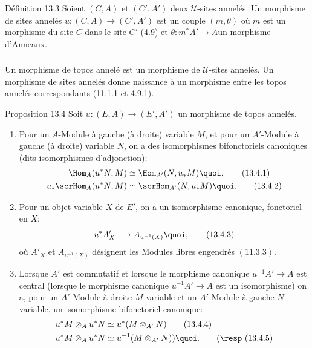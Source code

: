 \begin{enonce*}{Définition 13.3}
Soient $(C,A)$ et $(C',A')$ deux $𝒰$-sites annelés. Un
morphisme de sites annelés $u:(C,A)\rightarrow (C',A')$ est un
couple $(m,\theta)$ où $m$ est un morphisme du site $C$ dans le site
$C'$ (\hyperref[IV.subsec4.9]{4.9}) et $\theta:m^{\ast}A'\rightarrow
A$\pageoriginale un morphisme d'Anneaux.
\end{enonce*}

\setcounter{subsection}{3} \setcounter{subsubsection}{0}
\subsubsection{}
Un morphisme de topos annelé est un morphisme de $𝒰$-sites
annelés. Un morphisme de sites annelés donne naissance à un
morphisme entre les topos annelés correspondants
(\hyperref[IV.subsubsec11.1.1]{11.1.1} et \hyperref[IV.subsubsec4.9.1]{4.9.1}).

\begin{enonce*}{Proposition 13.4}
Soit $u:(E,A)\rightarrow (E',A')$ un morphisme de topos annelés.
\begin{enumerate}
\renewcommand{\theenumi}{\alph{enumi}}
\renewcommand{\labelenumi}{\theenumi)}
\item Pour un $A$-Module à gauche (\resp à droite) variable $M$, et
pour un $A'$-Module à gauche (\resp à droite) variable $N$, on a des
isomorphismes bifonctoriels canoniques (dits isomorphismes
d'adjonction):
\begin{align*}
\Hom_A(u^{\ast}N,M) &\simeq
\Hom_{A'}(N,u_{\ast}M){\quoi},\tag{13.4.1}\\
u_{\ast}\scrHom_A(u^{\ast}N,M) &\simeq
\scrHom_{A'}(N,u_{\ast}M){\quoi}.\tag{13.4.2}
\end{align*}

\item Pour un objet variable $X$ de $E'$, on a un isomorphisme
canonique, fonctoriel en $X$:
\begin{equation*}
u^{\ast}A'_X\longrightarrow A_{u^{-1}(X)}{\quoi},\tag{13.4.3}
\end{equation*}
où $A'_X$ et $A_{u^{-1}(X)}$ désignent les Modules libres engendrés
$(\hyperref[IV.prop11.3.3]{11.3.3})$.

\item Lorsque $A'$ est commutatif et lorsque le morphisme canonique
$u^{-1}A'\rightarrow A$ est central (\resp lorsque le morphisme
canonique $u^{-1}A'\rightarrow A$ est un isomorphisme) on a, pour un
$A'$-Module à droite $M$ variable et un $A'$-Module à gauche $N$
variable, un isomorphisme bifonctoriel canonique:
\begin{align*}
u^{\ast}M\otimes_A u^{\ast}N &\simeq
u^{\ast}(M\otimes_{A'}N)\tag{13.4.4}\\
u^{\ast}M\otimes_A u^{\ast}N &\simeq
u^{-1}(M\otimes_{A'}N)){\quoi}.\tag*{(\resp (13.4.5)}
\end{align*}
\end{enumerate}
\end{enonce*}

